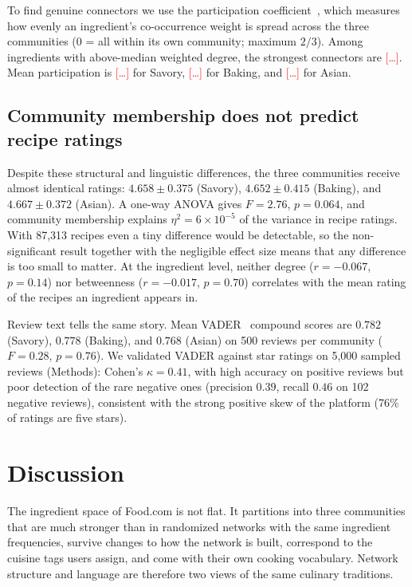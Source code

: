 \documentclass[9pt,twocolumn]{pnas-new}
\newcommand{\tbd}[1]{\textcolor{red}{[#1]}}
\begin{document}
To find genuine connectors we use the participation coefficient~\cite{guimera2005functional}, which measures how evenly an ingredient's co-occurrence weight is spread across the three communities ($0$ = all within its own community; maximum $2/3$). Among ingredients with above-median weighted degree, the strongest connectors are \tbd{\ldots}. Mean participation is \tbd{\ldots} for Savory, \tbd{\ldots} for Baking, and \tbd{\ldots} for Asian.

\subsection*{Community membership does not predict recipe ratings}

Despite these structural and linguistic differences, the three communities receive almost identical ratings: $4.658 \pm 0.375$ (Savory), $4.652 \pm 0.415$ (Baking), and $4.667 \pm 0.372$ (Asian). A one-way ANOVA gives $F = 2.76$, $p = 0.064$, and community membership explains $\eta^2 = 6 \times 10^{-5}$ of the variance in recipe ratings. With 87,313 recipes even a tiny difference would be detectable, so the non-significant result together with the negligible effect size means that any difference is too small to matter. At the ingredient level, neither degree ($r = -0.067$, $p = 0.14$) nor betweenness ($r = -0.017$, $p = 0.70$) correlates with the mean rating of the recipes an ingredient appears in.

Review text tells the same story. Mean VADER~\cite{hutto2014vader} compound scores are $0.782$ (Savory), $0.778$ (Baking), and $0.768$ (Asian) on 500 reviews per community ($F = 0.28$, $p = 0.76$). We validated VADER against star ratings on 5,000 sampled reviews (Methods): Cohen's $\kappa = 0.41$, with high accuracy on positive reviews but poor detection of the rare negative ones (precision $0.39$, recall $0.46$ on 102 negative reviews), consistent with the strong positive skew of the platform (76\% of ratings are five stars).

\section*{Discussion}

The ingredient space of Food.com is not flat. It partitions into three communities that are much stronger than in randomized networks with the same ingredient frequencies, survive changes to how the network is built, correspond to the cuisine tags users assign, and come with their own cooking vocabulary. Network structure and language are therefore two views of the same culinary traditions.
\end{document}
